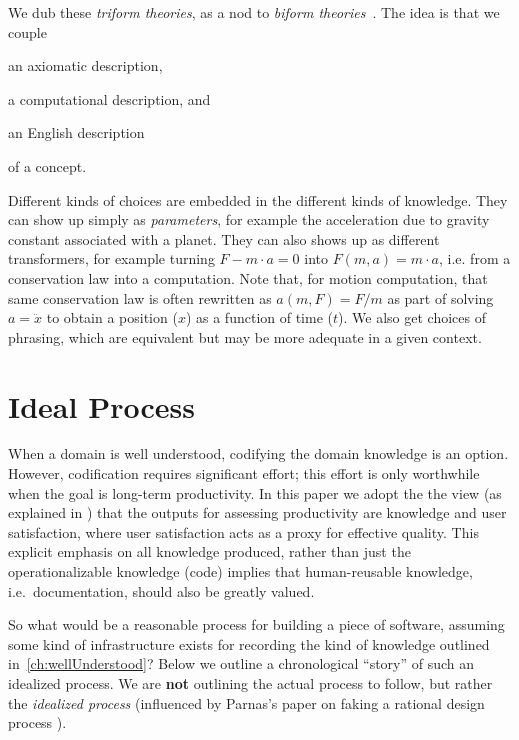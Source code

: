 \documentclass[sigconf,review]{acmart}
\begin{document}
We dub these \emph{triform theories}, as a nod to \emph{biform
theories}~\cite{Farmer2007}. The idea is that we couple 
\begin{enumerate*}
\item an axiomatic description,
\item a computational description, and
\item an English description
\end{enumerate*}
of a concept.

Different kinds of choices are embedded in the different kinds of knowledge.
They can show up simply as \emph{parameters}, for example the acceleration due
to gravity constant associated with a planet. They can also shows up as
different transformers, for example turning $F - m\cdot a = 0$ into $F\left(m,
a\right) = m\cdot a$, i.e. from a conservation law into a computation. Note
that, for motion computation, that same conservation law is often rewritten as
$a\left(m,F\right) = F/m$ as part of solving $a = \ddot{x}$ to obtain a position
($x$) as a function of time ($t$). We also get choices of phrasing, which are
equivalent but may be more adequate in a given context.

\section{Ideal Process}\label{ch:process}

When a domain is well understood, codifying the domain knowledge is an option.
However, codification requires significant effort; this effort is only
worthwhile when the goal is long-term productivity.  In this paper we adopt the
the view (as explained in \cite{SmithAndCarette2020arXiv}) that the outputs for
assessing productivity are knowledge and user satisfaction, where user
satisfaction acts as a proxy for effective quality. This explicit emphasis on
all knowledge produced, rather than just the operationalizable knowledge (code)
implies that human-reusable knowledge, i.e.\ documentation, should also be
greatly valued.

So what would be a reasonable process for building a piece of software, assuming
some kind of infrastructure exists for recording the kind of knowledge outlined
in~\autoref{ch:wellUnderstood}?  Below we outline a chronological ``story'' of
such an idealized process.  We are \textbf{not} outlining the actual process to
follow, but rather the \emph{idealized process} (influenced by Parnas's paper on
faking a rational design process \cite{Parnas1986}).
\end{document}
